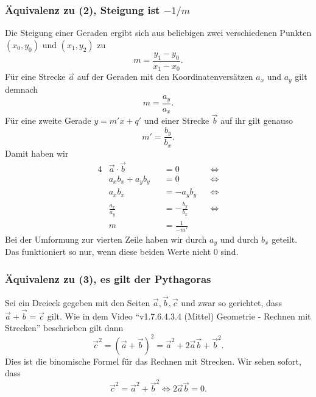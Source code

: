 \documentclass[a4paper]{amsart}
\theoremstyle{definition}
\begin{document}
\subsubsection{Äquivalenz zu (2), Steigung ist $-1/m$}
Die Steigung einer Geraden ergibt sich aus beliebigen zwei verschiedenen Punkten $(x_0,y_0)$ und $(x_1, y_2)$ zu
\begin{equation}
   m = \frac{y_1 - y_0}{x_1 - x_0}.
\end{equation}
Für eine Strecke $\vec a$ auf der Geraden mit den Koordinatenversätzen $a_x$ und $a_y$ gilt demnach
\begin{equation}
   m = \frac{a_y}{a_x}.
\end{equation}
Für eine zweite Gerade $y = m'x+q'$ und einer Strecke $\vec b$ auf ihr gilt genauso
\begin{equation}
   m' = \frac{b_y}{b_x}.
\end{equation}
Damit haben wir
\begin{alignat}{4}
   &\vec a \cdot \vec b &&= 0       &&\Leftrightarrow\\
   &a_xb_x + a_yb_y      &&= 0       &&\Leftrightarrow\\
   &a_xb_x               &&= -a_yb_y &&\Leftrightarrow\\
   &\frac{a_x}{a_y}      &&= -\frac{b_y}{b_x} &&\Leftrightarrow\\
   &m                    &&= \frac{1}{-m'}
\end{alignat}
Bei der Umformung zur vierten Zeile haben wir durch $a_y$ und durch $b_x$ geteilt. Das funktioniert so nur, wenn diese beiden Werte nicht $0$ sind.

\noindent{}

\subsubsection{Äquivalenz zu (3), es gilt der Pythagoras}
Sei ein Dreieck gegeben mit den Seiten $\vec a, \vec b, \vec c$ und zwar so gerichtet, dass $\vec a + \vec b = \vec c$ gilt. Wie in dem Video "`v1.7.6.4.3.4 (Mittel) Geometrie - Rechnen mit Strecken"' beschrieben gilt dann 
\begin{equation}
   \vec c ^2 = (\vec a + \vec b)^2 = \vec a^2 + 2\vec a \vec b + \vec b^2.
\end{equation}
Dies ist die binomische Formel für das Rechnen mit Strecken. Wir sehen sofort, dass
\begin{equation}
   \vec c ^2 = \vec a^2 + \vec b^2 \Leftrightarrow 2\vec a \vec b = 0.
\end{equation}
\end{document}
